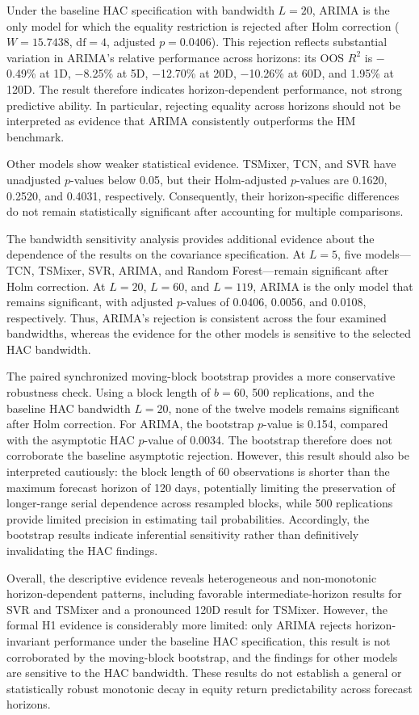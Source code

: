 \documentclass[12pt,twoside]{ord}
\begin{document}
Under the baseline HAC specification with bandwidth $L=20$, ARIMA is the only model for which the equality restriction is rejected after Holm correction ($W=15.7438$, $\mathrm{df}=4$, adjusted $p=0.0406$). This rejection reflects substantial variation in ARIMA's relative performance across horizons: its OOS $R^2$ is $-$0.49\% at 1D, $-$8.25\% at 5D, $-$12.70\% at 20D, $-$10.26\% at 60D, and 1.95\% at 120D. The result therefore indicates horizon-dependent performance, not strong predictive ability. In particular, rejecting equality across horizons should not be interpreted as evidence that ARIMA consistently outperforms the HM benchmark.

Other models show weaker statistical evidence. TSMixer, TCN, and SVR have unadjusted $p$-values below 0.05, but their Holm-adjusted $p$-values are 0.1620, 0.2520, and 0.4031, respectively. Consequently, their horizon-specific differences do not remain statistically significant after accounting for multiple comparisons.

The bandwidth sensitivity analysis provides additional evidence about the dependence of the results on the covariance specification. At $L=5$, five models---TCN, TSMixer, SVR, ARIMA, and Random Forest---remain significant after Holm correction. At $L=20$, $L=60$, and $L=119$, ARIMA is the only model that remains significant, with adjusted $p$-values of 0.0406, 0.0056, and 0.0108, respectively. Thus, ARIMA's rejection is consistent across the four examined bandwidths, whereas the evidence for the other models is sensitive to the selected HAC bandwidth.

The paired synchronized moving-block bootstrap provides a more conservative robustness check. Using a block length of $b=60$, 500 replications, and the baseline HAC bandwidth $L=20$, none of the twelve models remains significant after Holm correction. For ARIMA, the bootstrap $p$-value is 0.154, compared with the asymptotic HAC $p$-value of 0.0034. The bootstrap therefore does not corroborate the baseline asymptotic rejection. However, this result should also be interpreted cautiously: the block length of 60 observations is shorter than the maximum forecast horizon of 120 days, potentially limiting the preservation of longer-range serial dependence across resampled blocks, while 500 replications provide limited precision in estimating tail probabilities. Accordingly, the bootstrap results indicate inferential sensitivity rather than definitively invalidating the HAC findings.

Overall, the descriptive evidence reveals heterogeneous and non-monotonic horizon-dependent patterns, including favorable intermediate-horizon results for SVR and TSMixer and a pronounced 120D result for TSMixer. However, the formal H1 evidence is considerably more limited: only ARIMA rejects horizon-invariant performance under the baseline HAC specification, this result is not corroborated by the moving-block bootstrap, and the findings for other models are sensitive to the HAC bandwidth. These results do not establish a general or statistically robust monotonic decay in equity return predictability across forecast horizons.
\end{document}

